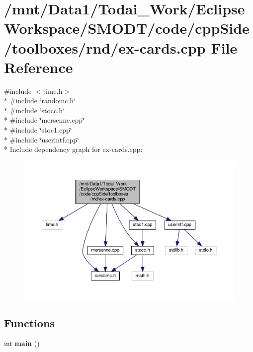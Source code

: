 \section{/mnt/\-Data1/\-Todai\-\_\-\-Work/\-Eclipse\-Workspace/\-S\-M\-O\-D\-T/code/cpp\-Side/toolboxes/rnd/ex-\/cards.cpp File Reference}
\label{toolboxes_2rnd_2ex-cards_8cpp}
{\ttfamily \#include $<$time.\-h$>$}\\*
{\ttfamily \#include \char`\"{}randomc.\-h\char`\"{}}\\*
{\ttfamily \#include \char`\"{}stocc.\-h\char`\"{}}\\*
{\ttfamily \#include \char`\"{}mersenne.\-cpp\char`\"{}}\\*
{\ttfamily \#include \char`\"{}stoc1.\-cpp\char`\"{}}\\*
{\ttfamily \#include \char`\"{}userintf.\-cpp\char`\"{}}\\*
Include dependency graph for ex-\/cards.cpp\-:
\nopagebreak
\begin{figure}[H]
\begin{center}
\leavevmode
\includegraphics[width=350pt]{toolboxes_2rnd_2ex-cards_8cpp__incl}
\end{center}
\end{figure}
\subsection*{Functions}
\begin{DoxyCompactItemize}
\item 
int {\bf main} ()
\end{DoxyCompactItemize}



